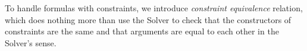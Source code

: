 \documentclass[english, mgr]{iithesis}
\renewcommand{\it}[1]{\textit{#1}}
\begin{document}
To handle formulas with constraints, we introduce \it{constraint equivalence} relation,
which does nothing more than use the Solver to check that the constructors of
constraints are the same and that arguments are equal to each other in the Solver's sense.



\end{document}
